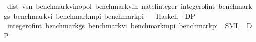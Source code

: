 \begin{isabellebody}
\isanewline
\isanewline
\isanewline
\isanewline
{}\isamarkupfalse%
\ dist\ vs{\isacharunderscore}{\kern0pt}n{\isacharprime}{\kern0pt}\ benchmark{\isacharunderscore}{\kern0pt}vi{\isacharunderscore}{\kern0pt}nopol\ benchmark{\isacharunderscore}{\kern0pt}vi{\isacharunderscore}{\kern0pt}n\ nat{\isacharunderscore}{\kern0pt}of{\isacharunderscore}{\kern0pt}integer\ integer{\isacharunderscore}{\kern0pt}of{\isacharunderscore}{\kern0pt}int\ benchmark{\isacharunderscore}{\kern0pt}gs\ benchmark{\isacharunderscore}{\kern0pt}vi\ benchmark{\isacharunderscore}{\kern0pt}mpi\ benchmark{\isacharunderscore}{\kern0pt}pi\isanewline
\ \ \ Haskell\ \ DP\isanewline
\isanewline
{}\isamarkupfalse%
\ integer{\isacharunderscore}{\kern0pt}of{\isacharunderscore}{\kern0pt}int\ benchmark{\isacharunderscore}{\kern0pt}gs\ benchmark{\isacharunderscore}{\kern0pt}vi\ benchmark{\isacharunderscore}{\kern0pt}mpi\ benchmark{\isacharunderscore}{\kern0pt}pi\ \ SML\ \ DP\isanewline
%
\isadelimtheory
\isanewline
%
\endisadelimtheory
%
\isatagtheory
{}\isamarkupfalse%
%
\endisatagtheory
{\isafoldtheory}%
%
\isadelimtheory
%
\endisadelimtheory
%
\end{isabellebody}%
\endinput
